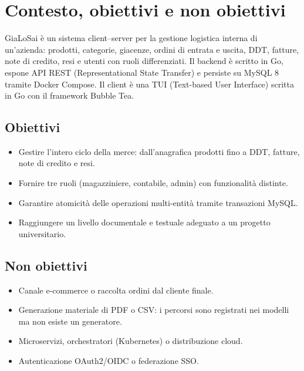 \documentclass[a4paper,12pt]{article}
\begin{document}

\newpage
\tableofcontents
\newpage

\section{Contesto, obiettivi e non obiettivi}

GiaLoSai \`{e} un sistema client--server per la gestione logistica interna di un'azienda: prodotti, categorie, giacenze, ordini di entrata e uscita, DDT, fatture, note di credito, resi e utenti con ruoli differenziati. Il backend \`{e} scritto in Go, espone API REST (Representational State Transfer) e persiste su MySQL 8 tramite Docker Compose. Il client \`{e} una TUI (Text-based User Interface) scritta in Go con il framework Bubble Tea.


\subsection{Obiettivi}
\begin{itemize}
    \item Gestire l'intero ciclo della merce: dall'anagrafica prodotti fino a DDT, fatture, note di credito e resi.
    \item Fornire tre ruoli (magazziniere, contabile, admin) con funzionalità distinte.
    \item Garantire atomicità delle operazioni multi-entità tramite transazioni MySQL.
    \item Raggiungere un livello documentale e testuale adeguato a un progetto universitario.
\end{itemize}

\subsection{Non obiettivi}
\begin{itemize}
    \item Canale e-commerce o raccolta ordini dal cliente finale.
    \item Generazione materiale di PDF o CSV: i percorsi sono registrati nei modelli ma non esiste un generatore.
    \item Microservizi, orchestratori (Kubernetes) o distribuzione cloud.
    \item Autenticazione OAuth2/OIDC o federazione SSO.
\end{itemize}
\end{document}
